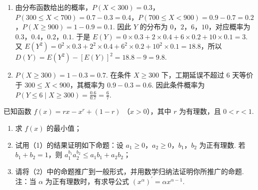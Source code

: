 \begin{solution}
\begin{enumerate}
\item 由分布函数给出的概率，\(P(X<300)=0.3\)，\(P(300\leqslant X<700)=0.7-0.3=0.4\)，\(P(700\leqslant X<900)=0.9-0.7=0.2\)，\(P(X\geqslant900)=1-0.9=0.1\). 因此 \(Y\) 的分布为 \(0\)，\(2\)，\(6\)，\(10\)，对应概率为 \(0.3\)，\(0.4\)，\(0.2\)，\(0.1\). 于是 \(E(Y)=0\times0.3+2\times0.4+6\times0.2+10\times0.1=3\). 又 \(E(Y^2)=0^2\times0.3+2^2\times0.4+6^2\times0.2+10^2\times0.1=18.8\)，所以 \(D(Y)=E(Y^2)-[E(Y)]^2=18.8-9=9.8\).
\item \(P(X\geqslant300)=1-0.3=0.7\). 在条件 \(X\geqslant300\) 下，工期延误不超过 \(6\) 天等价于 \(300\leqslant X<900\)，其概率为 \(0.9-0.3=0.6\). 因此条件概率为 \(\displaystyle P(Y\leqslant6\mid X\geqslant300)=\frac{0.6}{0.7}=\frac67\).
\end{enumerate}
\end{solution}

\setcounter{probnum}{21}
\begin{problem}
已知函数 \( f(x) = rx - x^{r} + (1 - r) \) （\(x > 0\)），其中 \(r\) 为有理数，且 \(0 < r < 1\).

\begin{enumerate}
\item 求 \(f(x)\) 的最小值；
\item 试用（1）的结果证明如下命题：设 \(a_{1} \geqslant 0\)，\(a_{2} \geqslant 0\)，\(b_{1}\)，\(b_{2}\) 为正有理数. 若 \(b_{1} + b_{2} = 1\)，则 \(a_{1}^{b_{1}} a_{2}^{b_{2}} \leqslant a_{1} b_{1} + a_{2} b_{2}\)；
\item 请将（2）中的命题推广到一般形式，并用数学归纳法证明你所推广的命题. 注：当 \(\alpha\) 为正有理数时，有求导公式 \((x^{\alpha})^{\prime} = \alpha x^{\alpha -1}\).
\end{enumerate}
\end{problem}

